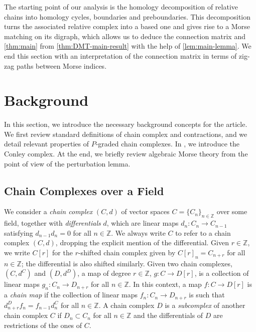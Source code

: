 \documentclass[11pt, table, nothms]{amsart}
\theoremstyle{definition}
\newcommand{\Z}{\mathbb{Z}}
\begin{document}
The starting point of our analysis is the homology decomposition of relative chains into homology cycles, boundaries and preboundaries.
This decomposition turns the associated relative complex into a based one and gives rise to a Morse matching on its digraph, which allows us to deduce the connection matrix and \cref{thm:main} from \cref{thm:DMT-main-result} with the help of \cref{lem:main-lemma}. We end this section with an interpretation of the connection matrix in terms of zig-zag paths between Morse indices.


\fi 

\section{Background} \label{sec:background}

In this section, we introduce the necessary background concepts for the article. We first review standard definitions of chain complex and contractions, and we detail relevant properties of $P$-graded chain complexes. In , we introduce the Conley complex. At the end, we briefly review algebraic Morse theory from the point of view of the perturbation lemma.

\subsection{Chain Complexes over a Field}\label{ssec:chain-complex-field}
We consider a \emph{chain complex} $(C, d)$ of vector spaces $C=\{C_n\}_{n \in \Z}$ over some field, together with \emph{differentials} $d$, which are linear maps $d_n\colon C_n \rightarrow C_{n-1}$ satisfying $d_{n-1}d_n=0$ for all $n \in \Z$. 
We always write $C$ to refer to a chain complex $(C, d)$, dropping the explicit mention of the differential. 
Given $r \in \Z$, we write $C[r]$ for the $r$-shifted chain complex given by $C[r]_n = C_{n+r}$ for all $n \in \Z$; the differential is also shifted similarly. 
Given two chain complexes, $(C, d^C)$ and $(D, d^D)$, a map of degree $r\in \Z$, $g\colon C\rightarrow D[r]$, is a collection of linear maps $g_n\colon C_n\rightarrow D_{n+r}$ for all $n \in \Z$. In this context, a map $f\colon C \rightarrow D[r]$ is a \emph{chain map} if the collection of linear maps $f_n\colon C_n \rightarrow D_{n+r}$ is such that $d^D_{n+r}f_n=f_{n-1}d^C_n$ for all $n \in \Z$. A chain complex $D$ is a \emph{subcomplex} of another chain complex $C$ if $D_n\subset C_n$ for all $n \in \Z$ and the differentials of $D$ are restrictions of the ones of $C$.
\end{document}
